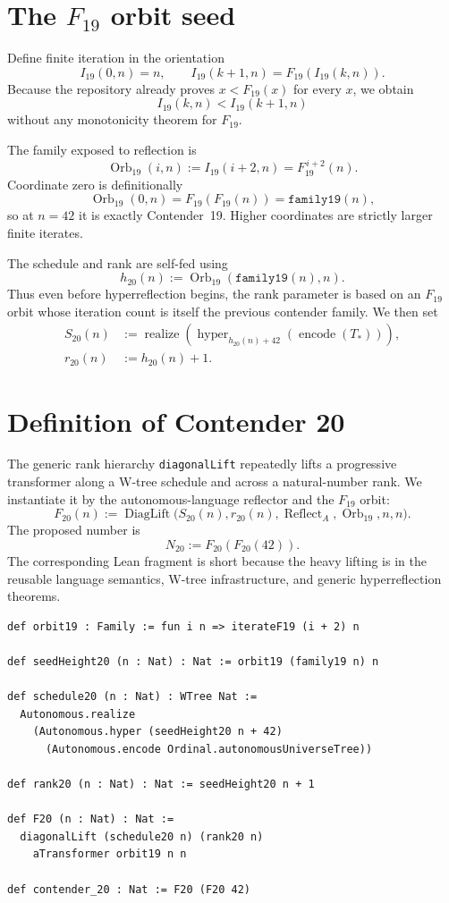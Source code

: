 \documentclass[11pt]{article}
\theoremstyle{definition}
\theoremstyle{remark}
\newcommand{\Orb}{\operatorname{Orb}_{19}}
\newcommand{\reflectA}{\operatorname{Reflect}_{A}}
\newcommand{\diagLift}{\operatorname{DiagLift}}
\begin{document}
\section{The \texorpdfstring{$F_{19}$}{F19} orbit seed}
\label{sec:orbit}

Define finite iteration in the orientation
\[
  I_{19}(0,n)=n,
  \qquad
  I_{19}(k+1,n)=F_{19}(I_{19}(k,n)).
\]
Because the repository already proves $x<F_{19}(x)$ for every $x$, we obtain
\[
  I_{19}(k,n)<I_{19}(k+1,n)
\]
without any monotonicity theorem for $F_{19}$.

The family exposed to reflection is
\[
  \Orb(i,n):=I_{19}(i+2,n)=F_{19}^{\,i+2}(n).
\]
Coordinate zero is definitionally
\[
  \Orb(0,n)=F_{19}(F_{19}(n))=\texttt{family19}(n),
\]
so at $n=42$ it is exactly Contender~19.  Higher coordinates are strictly
larger finite iterates.

The schedule and rank are self-fed using
\[
  h_{20}(n):=\Orb(\texttt{family19}(n),n).
\]
Thus even before hyperreflection begins, the rank parameter is based on an
$F_{19}$ orbit whose iteration count is itself the previous contender family.
We then set
\begin{align*}
 S_{20}(n)&:=\operatorname{realize}\left(
     \operatorname{hyper}_{h_{20}(n)+42}
       (\operatorname{encode}(T_{\!*}))\right),\\
 r_{20}(n)&:=h_{20}(n)+1.
\end{align*}

\section{Definition of Contender 20}
\label{sec:def20}

The generic rank hierarchy \texttt{diagonalLift} repeatedly lifts a progressive
transformer along a W-tree schedule and across a natural-number rank.  We
instantiate it by the autonomous-language reflector and the $F_{19}$ orbit:
\[
  F_{20}(n):=
  \diagLift\bigl(S_{20}(n),r_{20}(n),\reflectA,\Orb,n,n\bigr).
\]
The proposed number is
\[
  \boxed{N_{20}:=F_{20}(F_{20}(42)).}
\]
The corresponding Lean fragment is short because the heavy lifting is in the
reusable language semantics, W-tree infrastructure, and generic
hyperreflection theorems.

\begin{lstlisting}[caption={Core definition of Contender 20.},label={lst:core}]
def orbit19 : Family := fun i n => iterateF19 (i + 2) n

def seedHeight20 (n : Nat) : Nat := orbit19 (family19 n) n

def schedule20 (n : Nat) : WTree Nat :=
  Autonomous.realize
    (Autonomous.hyper (seedHeight20 n + 42)
      (Autonomous.encode Ordinal.autonomousUniverseTree))

def rank20 (n : Nat) : Nat := seedHeight20 n + 1

def F20 (n : Nat) : Nat :=
  diagonalLift (schedule20 n) (rank20 n)
    aTransformer orbit19 n n

def contender_20 : Nat := F20 (F20 42)
\end{lstlisting}
\end{document}

